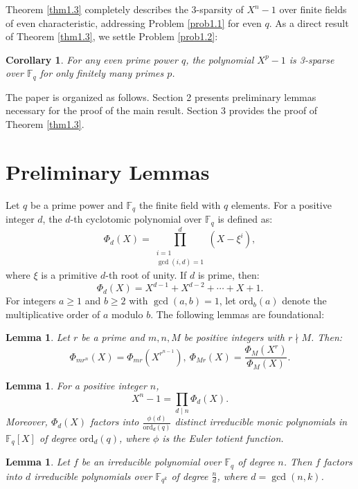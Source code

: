\documentclass[10pt,reqno]{amsart}
\newtheorem{cor}[thm]{Corollary}
\newtheorem{lem}[thm]{Lemma}
\theoremstyle{definition}
\theoremstyle{remark}
\numberwithin{equation}{section}
\begin{document}
Theorem \ref{thm1.3} completely describes the 3-sparsity of $X^n - 1$ over finite fields of even characteristic, addressing Problem \ref{prob1.1} for even $q$. As a direct result of Theorem \ref{thm1.3}, we settle Problem \ref{prob1.2}:

\begin{cor}\label{cor1.3}
For any even prime power $q$, the polynomial $X^p - 1$ is 3-sparse over $\mathbb{F}_q$ for only finitely many primes $p$.
\end{cor}

The paper is organized as follows. Section 2 presents preliminary lemmas necessary for the proof of the main result. Section 3 provides the proof of Theorem \ref{thm1.3}.

\section{Preliminary Lemmas}

Let $q$ be a prime power and $\mathbb{F}_q$ the finite field with $q$ elements. For a positive integer $d$, the $d$-th cyclotomic polynomial over $\mathbb{F}_q$ is defined as:
\[
\Phi_d(X) = \prod_{\substack{i=1 \\ \gcd(i,d)=1}}^d (X - \xi^i),
\]
where $\xi$ is a primitive $d$-th root of unity. If $d$ is prime, then:
\[
\Phi_d(X) = X^{d-1} + X^{d-2} + \cdots + X + 1.
\]
For integers $a \geq 1$ and $b \geq 2$ with $\gcd(a, b) = 1$, let $\text{ord}_b(a)$ denote the multiplicative order of $a$ modulo $b$. The following lemmas are foundational:

\begin{lem}\label{lem2.1}
{\cite[Exercise 2.57]{[LN97]}} Let $r$ be a prime and $m, n, M$ be positive integers with $r\nmid M$. Then:
$$\Phi_{mr^n}(X) = \Phi_{mr}(X^{r^{n-1}}),\ \Phi_{Mr}(X) =\frac{\Phi_M(X^r)}{\Phi_M(X)}.$$
\end{lem}

\begin{lem}\label{lem2.2}
{\cite[Theorem 2.47]{[LN97]}} For a positive integer $n$,
\[
X^n - 1 = \prod_{d \mid n} \Phi_d(X).
\]
Moreover, $\Phi_d(X)$ factors into $\frac{\phi(d)}{\text{ord}_d(q)}$ distinct irreducible monic polynomials in $\mathbb{F}_q[X]$ of degree $\text{ord}_d(q)$, where $\phi$ is the Euler totient function.
\end{lem}

\begin{lem}\label{lem2.3}
{\cite[Theorem 3.46]{[LN97]}} Let $f$ be an irreducible polynomial over $\mathbb{F}_q$ of degree $n$. Then $f$ factors into $d$ irreducible polynomials over $\mathbb{F}_{q^k}$ of degree $\frac{n}{d}$, where $d = \gcd(n, k)$.
\end{lem}
\end{document}
